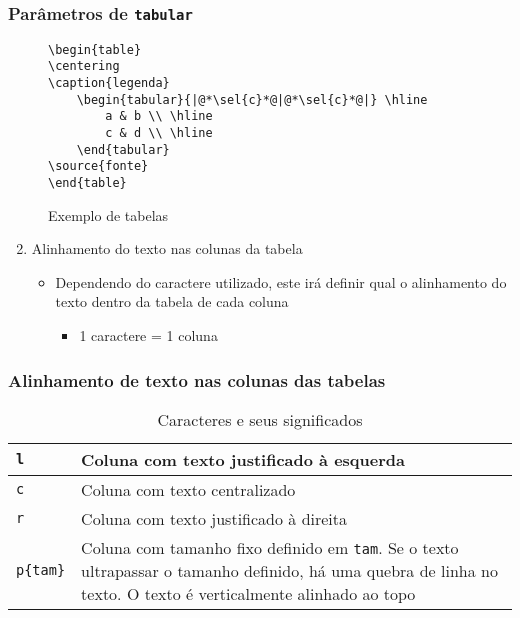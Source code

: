 \begin{frame}[fragile] \frametitle{Parâmetros de \texttt{tabular}}
\vspace{-0.5cm}
\begin{figure}[!t]
\caption{Exemplo de tabelas}
\begin{lstlisting}
\begin{table}
\centering
\caption{legenda}
	\begin{tabular}{|@*\sel{c}*@|@*\sel{c}*@|} \hline
		a & b \\ \hline
		c & d \\ \hline
	\end{tabular}
\source{fonte}
\end{table}
\end{lstlisting}
\ownsrc
\end{figure}

\begin{enumerate}
	\setcounter{enumi}{1}
	\item Alinhamento do texto nas colunas da tabela
	\begin{itemize}
		\item Dependendo do caractere utilizado, este irá definir qual o alinhamento do texto dentro da tabela de cada coluna 
		\begin{itemize}
			\item 1 caractere = 1 coluna
		\end{itemize}
	\end{itemize}
\end{enumerate}
\end{frame}

\begin{frame}[fragile] \frametitle{Alinhamento de texto nas colunas das tabelas}

\begin{table}[!t]
\caption{Caracteres e seus significados}
\begin{tabular}{l|p{9cm}} \hline
\texttt{l}			& Coluna com texto justificado à esquerda \\ \hline
\texttt{c}			& Coluna com texto centralizado \\ \hline
\texttt{r}			& Coluna com texto justificado à direita \\ \hline
\texttt{p\{tam\}}	& Coluna com tamanho fixo definido em \texttt{tam}. Se o texto ultrapassar o tamanho definido, há uma quebra de linha no texto. O texto é verticalmente alinhado ao topo \\ \hline
\end{tabular}
\\ \vspace{0.25cm} \ownsrc
\end{table}
\end{frame}

